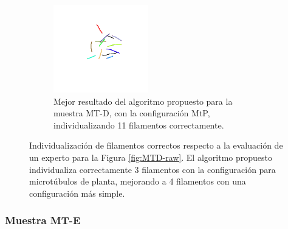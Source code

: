 \begin{figure}[h!]
\begin{subfigure}[t]{0.48\textwidth}
        \label{fig:MTD-best-define}
    \end{subfigure}
    \hspace{0.2cm}
    \begin{subfigure}[t]{0.48\textwidth}
        \centering
        \includegraphics[height=1.5in]{resultImages/field4-t0-phil-s6821-v05-exactMatch-no-label-ants.png}
        \caption{Mejor resultado del algoritmo propuesto para la muestra MT-D, con la configuraci\'on MtP, individualizando 11 filamentos correctamente.}
        \label{fig:MTD-best-phil}
    \end{subfigure}
        
    \caption[Individualizaci\'on de filamentos correctos respecto a la evaluaci\'on de un experto para la Figura \ref{fig:MTD-raw}.]{Individualizaci\'on de filamentos correctos respecto a la evaluaci\'on de un experto para la Figura \ref{fig:MTD-raw}. El algoritmo propuesto individualiza correctamente 3 filamentos con la configuraci\'on para microt\'ubulos de planta, mejorando a 4 filamentos con una configuraci\'on m\'as simple.}
    \label{fig:MTD-results}
\end{figure}

\subsubsection{Muestra MT-E}

